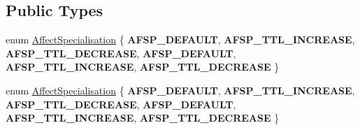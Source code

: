 \subsection*{Public Types}
\begin{DoxyCompactItemize}
\item 
enum \hyperlink{classPUAffector_aa4e8045ac29ee020895fd3e386935013}{Affect\+Specialisation} \{ \newline
{\bfseries A\+F\+S\+P\+\_\+\+D\+E\+F\+A\+U\+LT}, 
{\bfseries A\+F\+S\+P\+\_\+\+T\+T\+L\+\_\+\+I\+N\+C\+R\+E\+A\+SE}, 
{\bfseries A\+F\+S\+P\+\_\+\+T\+T\+L\+\_\+\+D\+E\+C\+R\+E\+A\+SE}, 
{\bfseries A\+F\+S\+P\+\_\+\+D\+E\+F\+A\+U\+LT}, 
\newline
{\bfseries A\+F\+S\+P\+\_\+\+T\+T\+L\+\_\+\+I\+N\+C\+R\+E\+A\+SE}, 
{\bfseries A\+F\+S\+P\+\_\+\+T\+T\+L\+\_\+\+D\+E\+C\+R\+E\+A\+SE}
 \}
\item 
enum \hyperlink{classPUAffector_aa4e8045ac29ee020895fd3e386935013}{Affect\+Specialisation} \{ \newline
{\bfseries A\+F\+S\+P\+\_\+\+D\+E\+F\+A\+U\+LT}, 
{\bfseries A\+F\+S\+P\+\_\+\+T\+T\+L\+\_\+\+I\+N\+C\+R\+E\+A\+SE}, 
{\bfseries A\+F\+S\+P\+\_\+\+T\+T\+L\+\_\+\+D\+E\+C\+R\+E\+A\+SE}, 
{\bfseries A\+F\+S\+P\+\_\+\+D\+E\+F\+A\+U\+LT}, 
\newline
{\bfseries A\+F\+S\+P\+\_\+\+T\+T\+L\+\_\+\+I\+N\+C\+R\+E\+A\+SE}, 
{\bfseries A\+F\+S\+P\+\_\+\+T\+T\+L\+\_\+\+D\+E\+C\+R\+E\+A\+SE}
 \}
\end{DoxyCompactItemize}
